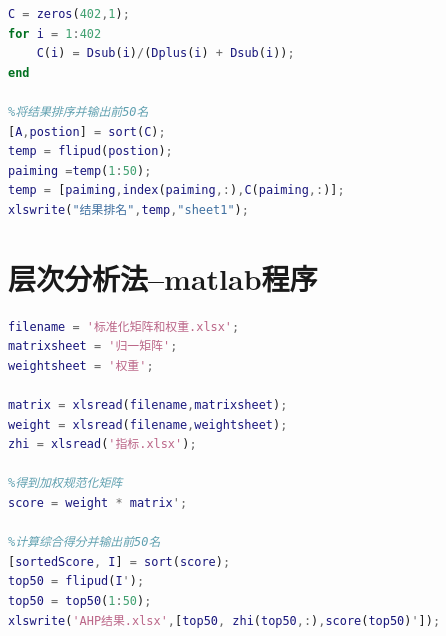 \documentclass{cumcmthesis}
\begin{document}
\begin{appendices}
\begin{lstlisting}[language=matlab]
%得到理想贴进度
C = zeros(402,1);
for i = 1:402
    C(i) = Dsub(i)/(Dplus(i) + Dsub(i));
end

%将结果排序并输出前50名
[A,postion] = sort(C);
temp = flipud(postion);
paiming =temp(1:50);
temp = [paiming,index(paiming,:),C(paiming,:)];
xlswrite("结果排名",temp,"sheet1");
\end{lstlisting}
    \section{层次分析法--matlab程序}
    \begin{lstlisting}[language=matlab]
%读入数据
filename = '标准化矩阵和权重.xlsx';
matrixsheet = '归一矩阵';
weightsheet = '权重';

matrix = xlsread(filename,matrixsheet);
weight = xlsread(filename,weightsheet);
zhi = xlsread('指标.xlsx');

%得到加权规范化矩阵
score = weight * matrix';

%计算综合得分并输出前50名
[sortedScore, I] = sort(score);
top50 = flipud(I');
top50 = top50(1:50);
xlswrite('AHP结果.xlsx',[top50, zhi(top50,:),score(top50)']);
\end{lstlisting}
\end{appendices}
\end{document}
